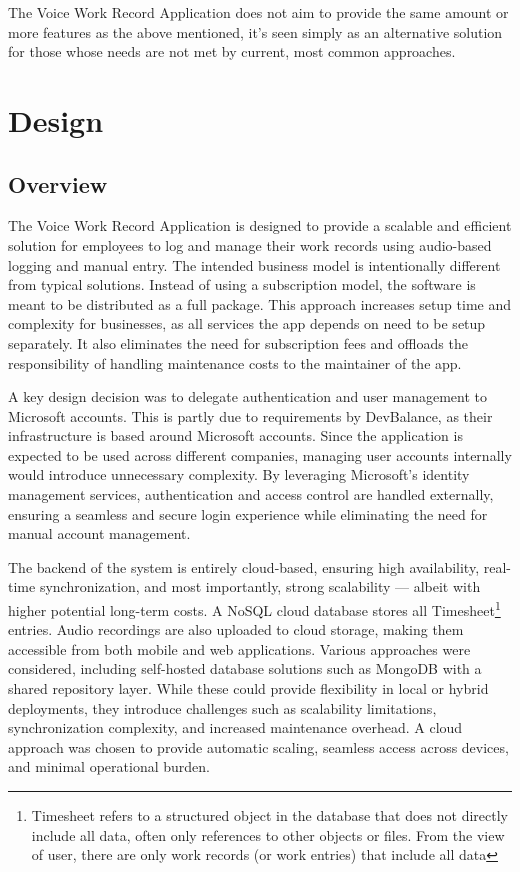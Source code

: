 \documentclass[
  digital,     %
  oneside,     %
  nosansbold,  %
  nocolorbold, %
  lof,         %
  lot,         %
]{fithesis4}
\begin{document}
The Voice Work Record Application does not aim to provide the same amount or more features as the above mentioned, it's seen simply as an alternative solution for those whose needs are not met by current, most common approaches.

\chapter{Design}
\label{chap:design}

\section{Overview}

The Voice Work Record Application is designed to provide a scalable and efficient solution for employees to log and manage their work records using audio-based logging and manual entry. The intended business model is intentionally different from typical solutions. Instead of using a subscription model, the software is meant to be distributed as a full package. This approach increases setup time and complexity for businesses, as all services the app depends on need to be setup separately. It also eliminates the need for subscription fees and offloads the responsibility of handling maintenance costs to the maintainer of the app.

A key design decision was to delegate authentication and user management to Microsoft accounts. This is partly due to requirements by DevBalance, as their infrastructure is based around Microsoft accounts. Since the application is expected to be used across different companies, managing user accounts internally would introduce unnecessary complexity. By leveraging Microsoft's identity management services, authentication and access control are handled externally, ensuring a seamless and secure login experience while eliminating the need for manual account management.

The backend of the system is entirely cloud-based, ensuring high availability, real-time synchronization, and most importantly, strong scalability --- albeit with higher potential long-term costs. A \acrshort{NoSQL} cloud database stores all Timesheet\footnote{Timesheet refers to a structured object in the database that does not directly include all data, often only references to other objects or files. From the view of user, there are only work records (or work entries) that include all data} entries. Audio recordings are also uploaded to cloud storage, making them accessible from both mobile and web applications. Various approaches were considered, including self-hosted database solutions such as MongoDB with a shared repository layer. While these could provide flexibility in local or hybrid deployments, they introduce challenges such as scalability limitations, synchronization complexity, and increased maintenance overhead. A cloud approach was chosen to provide automatic scaling, seamless access across devices, and minimal operational burden.
\end{document}
